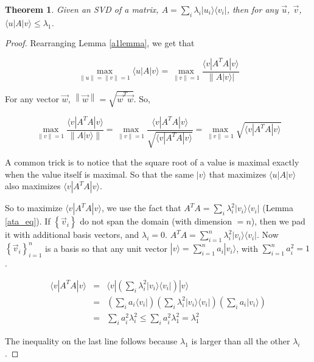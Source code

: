 \documentclass{amsbook}
\newtheorem{theorem}{Theorem}
\begin{document}
 \begin{theorem}
\label{upperbound}
Given an SVD of a matrix, $A=\sum_i\lambda_i|u_i\rangle\langle v_i|$, then for any $\vec u$, $\vec v$, $\langle u|A|v\rangle\leq\lambda_1$.
 \end{theorem}

\begin{proof}
Rearranging Lemma \ref{a1lemma}, we get that

$$
\max_{\|u\|=\|v\|=1}\langle u|A|v\rangle = \max_{\|v\|=1} \frac{\langle v|A^TA|v\rangle}{\left\|A|v\rangle\right|}
$$

For any vector $\vec w$, $\left\|\vec w\right\|=\sqrt{\vec w^T\vec w}$.  So,

$$
\max_{\|v\|=1} \frac{\langle v|A^TA|v\rangle}{\left\|A|v\rangle\right\|}
= \max_{\|v\|=1} \frac{\langle v|A^TA|v\rangle}{\sqrt{\langle v|A^TA|v\rangle}}
= \max_{\|v\|=1} \sqrt{\langle v|A^TA|v\rangle}
$$

A common trick is to notice that the square root of a value is maximal exactly when the value itself is maximal.  So that the same $|v\rangle$ that maximizes $\langle u|A|v\rangle$ also maximizes $\langle v|A^TA|v\rangle$.

So to maximize $\langle v|A^TA|v\rangle$, we use the fact that $A^TA=\sum_i\lambda_i^2|v_i\rangle\langle v_i|$ (Lemma \ref{ata_eq}).  If $\left\{\vec v_i\right\}$ do not span the domain (with dimension $=n$), then we pad it with additional basis vectors, and $\lambda_i=0$.  $A^TA=\sum_{i=1}^n\lambda_i^2|v_i\rangle\langle v_i|$.  Now $\left\{\vec v_i\right\}_{i=1}^n$ is a basis so that any unit vector $|v\rangle = \sum_{i=1}^na_i|v_i\rangle$, with $\sum_{i=1}^na_i^2 =1$.

\begin{equation}
\label{upperbound_eqn}
\begin{array}{rcl}
\langle v|A^TA|v\rangle &=& \langle v|\left(\sum_i\lambda_i^2|v_i\rangle\langle v_i|\right)|v\rangle \\
 &=& \left(\sum_i a_i\langle v_i|\right)\left(\sum_i\lambda_i^2|v_i\rangle\langle v_i|\right)\left(\sum_i a_i|v_i\rangle\right) \\
 &=& \sum_ia_i^2\lambda_i^2 
 \leq \sum_ia_i^2\lambda_1^2 
 = \lambda_1^2
\end{array}
\end{equation}

The inequality on the last line follows because $\lambda_1$ is larger than all the other $\lambda_i$.
\end{proof}
\end{document}
